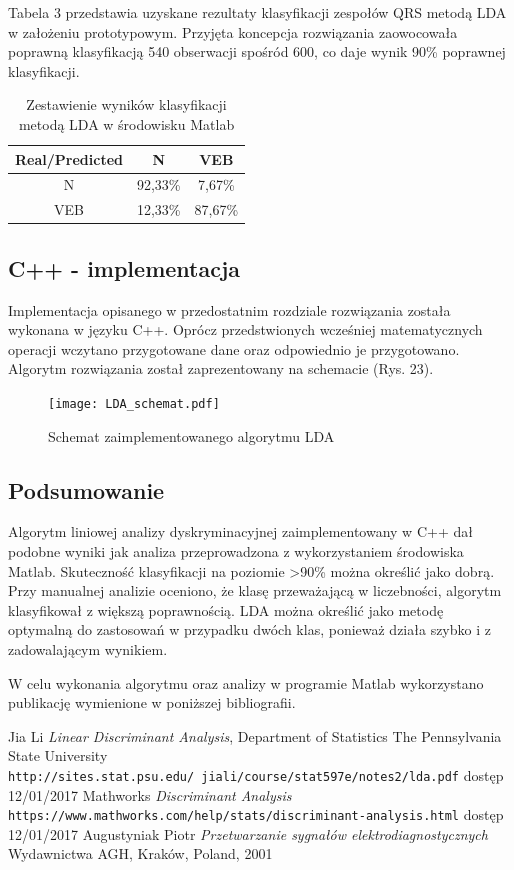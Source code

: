 \documentclass[[10pt,a4paper]{article}
\begin{document}
Tabela 3 przedstawia uzyskane rezultaty klasyfikacji zespołów QRS metodą LDA w założeniu prototypowym. Przyjęta koncepcja rozwiązania zaowocowała poprawną klasyfikacją 540 obserwacji spośród 600, co daje wynik 90\% poprawnej klasyfikacji. 

\begin{table}[h]
\centering
\caption{Zestawienie wyników klasyfikacji metodą LDA w środowisku Matlab}
\label{my-label}
\begin{tabular}{c|c|c}
Real/Predicted & N       & VEB     \\ \hline
N              & 92,33\% & 7,67\%  \\ \hline
VEB            & 12,33\% & 87,67\%
\end{tabular}
\end{table}

\subsection{C++ - implementacja}
Implementacja opisanego w przedostatnim rozdziale rozwiązania została wykonana w języku C++. Oprócz przedstwionych wcześniej matematycznych operacji wczytano przygotowane dane oraz odpowiednio je przygotowano. Algorytm rozwiązania został zaprezentowany na schemacie  (Rys. 23).
\begin{figure}
	\begin{center}
			\texttt{[image: LDA\_schemat.pdf]}
		\caption{Schemat zaimplementowanego algorytmu LDA}
	\end{center}
\end{figure}


\subsection{Podsumowanie}
Algorytm liniowej analizy dyskryminacyjnej zaimplementowany w C++ dał podobne wyniki jak analiza przeprowadzona z wykorzystaniem środowiska Matlab. Skuteczność klasyfikacji na poziomie >90\% można określić jako dobrą. Przy manualnej analizie oceniono, że klasę przeważającą w liczebności, algorytm klasyfikował z większą poprawnością. LDA można określić jako metodę optymalną do zastosowań w przypadku dwóch klas, ponieważ działa szybko i z zadowalającym wynikiem. 

W celu wykonania algorytmu oraz analizy w programie Matlab wykorzystano publikację wymienione w poniższej bibliografii.

\begin{thebibliography}{9}
Jia Li
\textit{Linear Discriminant Analysis}, Department of Statistics
The Pennsylvania State University
\\\texttt {http://sites.stat.psu.edu/~jiali/course/stat597e/notes2/lda.pdf}
dostęp 12/01/2017
Mathworks
\textit{Discriminant Analysis}
\\\texttt {https://www.mathworks.com/help/stats/discriminant-analysis.html}
dostęp 12/01/2017
Augustyniak Piotr
\textit{Przetwarzanie sygnałów elektrodiagnostycznych} 
Wydawnictwa AGH, Kraków, Poland, 2001

\end{thebibliography}
\end{document}
